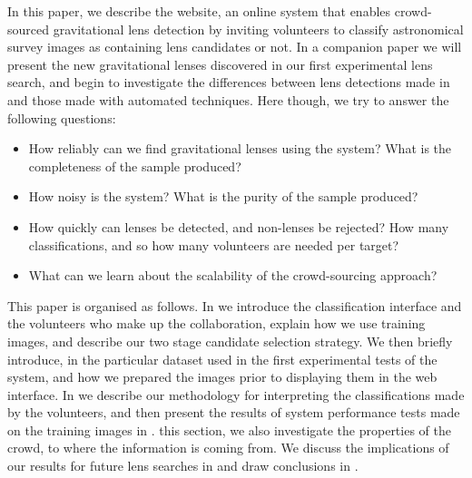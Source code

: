 \documentclass[useAMS,usenatbib,a4paper]{mn2e}
\begin{document}
In this paper, we describe the \sw website, an online system that enables 
crowd-sourced gravitational lens detection by inviting volunteers to classify
astronomical survey images as containing lens candidates or not.  In a
companion paper we will present the new gravitational lenses discovered in our
first experimental lens search, and begin to investigate the differences
between lens detections made in \sw and those made with automated techniques.
Here though, we try to answer the following questions:

\begin{itemize}

\item How reliably can we find gravitational lenses using the \sw
system? What is the completeness of the sample produced?

\item How noisy is the system? What is the purity of the sample
produced?

\item How quickly can lenses be detected, and non-lenses be rejected?
How many classifications, and so how many volunteers are needed per target?

\item What can we learn about the scalability of the crowd-sourcing approach?

\end{itemize}

This paper is organised as follows.  In  we introduce the \sw
classification interface and the volunteers who make up the \sw
collaboration,  explain how we use training images, and describe our two stage
candidate selection strategy. We then briefly introduce, in 
the particular dataset used in the first experimental tests of the \sw system,
and how we prepared the images prior to displaying them in the web interface.
In  we describe our methodology for interpreting the
classifications made by the volunteers, and then present the results of system
performance tests  made on the training images in . %
this section, we also investigate the properties of the crowd, to %
where the information is coming from. We discuss the implications of our
results for future lens searches in  and draw conclusions in
.
\end{document}
